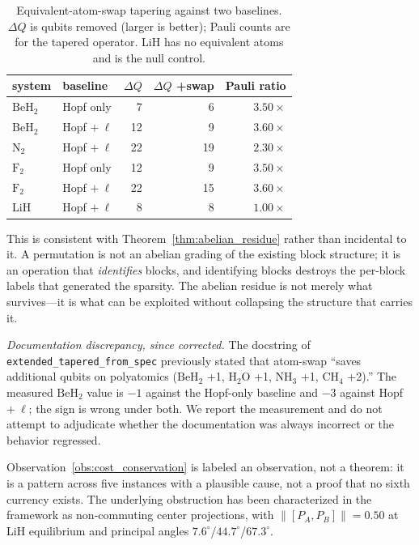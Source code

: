 \documentclass[aps,pra,twocolumn,superscriptaddress,longbibliography]{revtex4-2}
\begin{document}
\begin{table}[b]
\caption{Equivalent-atom-swap tapering against two baselines.
$\Delta Q$ is qubits removed (larger is better); Pauli counts are for the
tapered operator.  LiH has no equivalent atoms and is the null control.}
\label{tab:swap}
\begin{ruledtabular}
\begin{tabular}{llrrr}
system & baseline & $\Delta Q$ & $\Delta Q$ +swap & Pauli ratio \\
\hline
$\mathrm{BeH_2}$ & Hopf only & 7 & 6 & $3.50\times$ \\
$\mathrm{BeH_2}$ & Hopf $+\ \ell$ & 12 & 9 & $3.60\times$ \\
$\mathrm{N_2}$ & Hopf $+\ \ell$ & 22 & 19 & $2.30\times$ \\
$\mathrm{F_2}$ & Hopf only & 12 & 9 & $3.50\times$ \\
$\mathrm{F_2}$ & Hopf $+\ \ell$ & 22 & 15 & $3.60\times$ \\
LiH & Hopf $+\ \ell$ & 8 & 8 & $1.00\times$ \\
\end{tabular}
\end{ruledtabular}
\end{table}

This is consistent with Theorem~\ref{thm:abelian_residue} rather than
incidental to it.  A permutation is not an abelian grading of the existing
block structure; it is an operation that \emph{identifies} blocks, and
identifying blocks destroys the per-block labels that generated the
sparsity.  The abelian residue is not merely what survives---it is what
can be exploited without collapsing the structure that carries it.

\emph{Documentation discrepancy, since corrected.} The docstring of
\texttt{extended\_tapered\_from\_spec} previously stated that atom-swap ``saves
additional qubits on polyatomics ($\mathrm{BeH_2}$ +1, $\mathrm{H_2O}$ +1,
$\mathrm{NH_3}$ +1, $\mathrm{CH_4}$ +2).''  The measured $\mathrm{BeH_2}$
value is $-1$ against the Hopf-only baseline and $-3$ against Hopf
$+\ \ell$; the sign is wrong under both.  We report the measurement and
do not attempt to adjudicate whether the documentation was always
incorrect or the behavior regressed.

Observation~\ref{obs:cost_conservation} is labeled an observation, not a
theorem: it is a pattern across five instances with a plausible cause,
not a proof that no sixth currency exists.  The underlying obstruction
has been characterized in the framework as non-commuting center
projections, with $\|[P_A, P_B]\| = 0.50$ at LiH equilibrium and
principal angles $7.6^\circ$/$44.7^\circ$/$67.3^\circ$.
\end{document}
